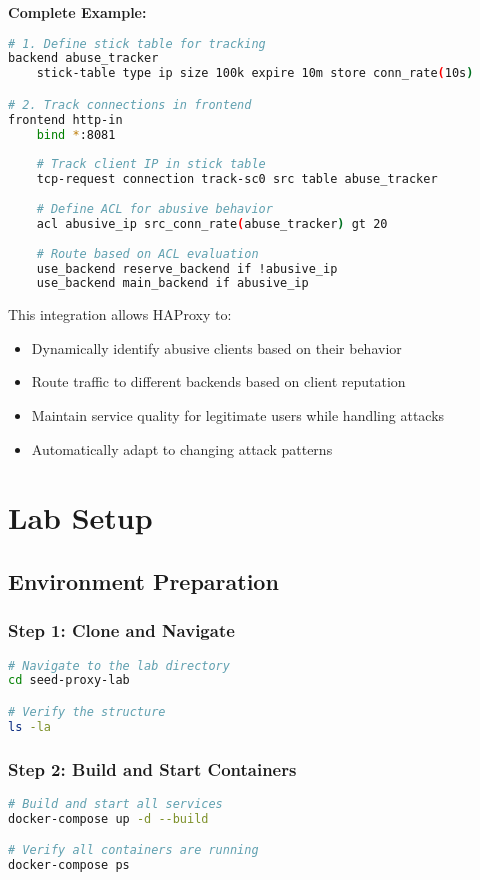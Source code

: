\documentclass[12pt]{article}
\begin{document}
\textbf{Complete Example:}
\begin{lstlisting}[language=bash]
# 1. Define stick table for tracking
backend abuse_tracker
    stick-table type ip size 100k expire 10m store conn_rate(10s)

# 2. Track connections in frontend
frontend http-in
    bind *:8081
    
    # Track client IP in stick table
    tcp-request connection track-sc0 src table abuse_tracker
    
    # Define ACL for abusive behavior
    acl abusive_ip src_conn_rate(abuse_tracker) gt 20
    
    # Route based on ACL evaluation
    use_backend reserve_backend if !abusive_ip
    use_backend main_backend if abusive_ip
\end{lstlisting}

This integration allows HAProxy to:
\begin{itemize}
    \item Dynamically identify abusive clients based on their behavior
    \item Route traffic to different backends based on client reputation
    \item Maintain service quality for legitimate users while handling attacks
    \item Automatically adapt to changing attack patterns
\end{itemize}

\section{Lab Setup}

\subsection{Environment Preparation}

\subsubsection{Step 1: Clone and Navigate}
\begin{lstlisting}[language=bash]
# Navigate to the lab directory
cd seed-proxy-lab

# Verify the structure
ls -la
\end{lstlisting}

\subsubsection{Step 2: Build and Start Containers}
\begin{lstlisting}[language=bash]
# Build and start all services
docker-compose up -d --build

# Verify all containers are running
docker-compose ps
\end{lstlisting}
\end{document}
